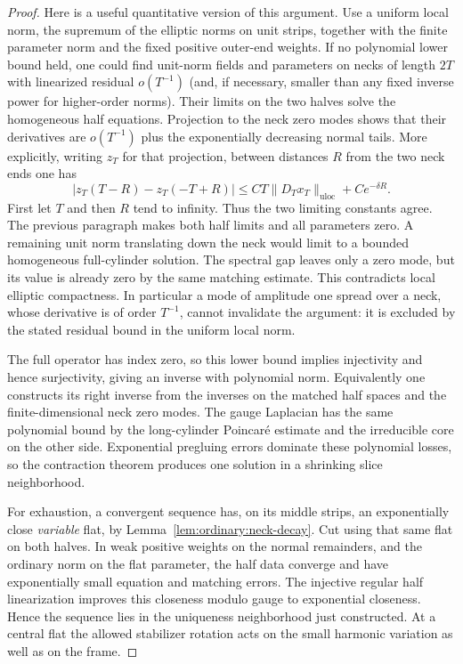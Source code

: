 \begin{proof}
Here is a useful quantitative version of this argument.  Use a
uniform local norm, the supremum of the elliptic norms on unit
strips, together with the finite parameter norm and the fixed
positive outer-end weights.  If no polynomial lower bound held,
one could find unit-norm fields and parameters on necks of length
$2T$ with linearized residual $o(T^{-1})$ (and, if necessary,
smaller than any fixed inverse power for higher-order norms).
Their limits on the two halves solve the homogeneous half
equations.  Projection to the neck zero modes shows that their
derivatives are $o(T^{-1})$ plus the exponentially decreasing
normal tails.  More explicitly, writing $z_T$ for that projection,
between distances $R$ from the two neck ends one has
\[
 |z_T(T-R)-z_T(-T+R)|
 \le CT\|D_Tx_T\|_{\mathrm{uloc}}+Ce^{-\delta R}.
\]
First let $T$ and then $R$ tend to infinity.  Thus the two limiting
constants agree.  The
previous paragraph makes both half limits and all parameters
zero.  A remaining unit norm translating down the neck would
limit to a bounded homogeneous full-cylinder solution.  The
spectral gap leaves only a zero mode, but its value is already
zero by the same matching estimate.  This contradicts local
elliptic compactness.  In particular a mode of amplitude one
spread over a neck, whose derivative is of order $T^{-1}$,
cannot invalidate the argument: it is excluded by the stated
residual bound in the uniform local norm.

The full operator has index zero, so this lower bound implies
injectivity and hence surjectivity, giving an inverse with polynomial norm.
Equivalently one constructs its right inverse from the inverses
on the matched half spaces and the finite-dimensional neck zero
modes.  The gauge Laplacian has the same polynomial bound by
the long-cylinder Poincar\'e estimate and the irreducible core
on the other side.  Exponential pregluing errors dominate these
polynomial losses, so the contraction theorem produces one
solution in a shrinking slice neighborhood.

For exhaustion, a convergent sequence has, on its middle strips,
an exponentially close \emph{variable} flat, by
Lemma~\ref{lem:ordinary:neck-decay}.  Cut using that same flat on
both halves.  In weak positive weights on the normal remainders,
and the ordinary norm on the flat parameter, the half data
converge and have exponentially small equation and matching
errors.  The injective regular half linearization improves this
closeness modulo gauge to exponential closeness.  Hence the
sequence lies in the uniqueness neighborhood just constructed.
At a central flat the allowed stabilizer rotation acts on the
small harmonic variation as well as on the frame.


\end{proof}

